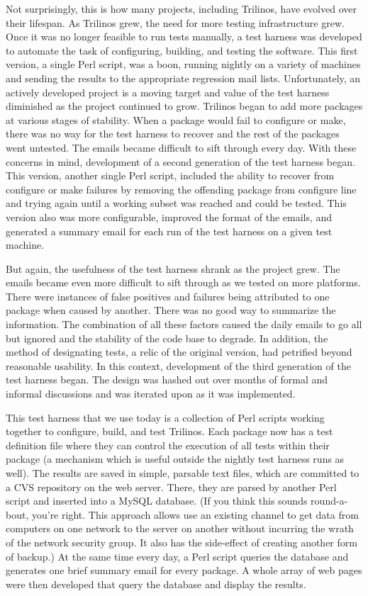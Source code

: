 \documentclass[12pt,relax]{article}
\begin{document}
Not surprisingly, this is how many projects, including Trilinos, have evolved
over their lifespan.  As Trilinos grew, the need for more testing
infrastructure grew.  Once it was no longer feasible to run tests manually,
a test harness was developed to automate the task of configuring, building, 
and testing the software.  This first version, a single Perl script, was a
boon, running nightly on a variety of machines and sending the results to the
appropriate regression mail lists.  Unfortunately, an actively developed
project is a moving target and value of the test harness diminished as the
project continued to grow.  Trilinos began to add more packages at various
stages of stability.  When a package would fail to configure or make, there
was no way for the test harness to recover and the rest of the packages went
untested.  The emails became difficult to sift through every day.  With these
concerns in mind, development of a second generation of the test harness began.
This version, another single Perl script, included the ability to recover from
configure or make failures by removing the offending package from configure
line and trying again until a working subset was reached and could be tested.  
This version also was more configurable, improved the format of the emails, and
generated a summary email for each run of the test harness on a given test
machine.

But again, the usefulness of the test harness shrank as the project grew.  The
emails became even more difficult to sift through as we tested on more
platforms.  There were instances of false positives and failures being
attributed to one package when caused by another.  There was no good way to
summarize the information.  The combination of all these factors caused the
daily emails to go all but ignored and the stability of the code base to 
degrade.  In addition, the method of designating tests, a relic of the original 
version, had petrified beyond reasonable usability.  In this context,
development of the third generation of the test harness began.  The design
was hashed out over months of formal and informal discussions and was iterated
upon as it was implemented.

This test harness that we use today is a collection of Perl scripts working
together to configure, build, and test Trilinos.  Each package now has a test
definition file where they can control the execution of all tests within their
package (a mechanism which is useful outside the nightly test harness runs
as well).  The results are saved in simple, parsable text files, which are
committed to a CVS repository on the web server.  There, they are parsed by
another Perl script and inserted into a MySQL database.  (If you think this
sounds round-a-bout, you're right.  This approach allows use an existing
channel to get data from computers on one network to the server on another
without incurring the wrath of the network security group.  It also has the
side-effect of creating another form of backup.)  At the same time every day,
a Perl script queries the database and generates one brief summary email for
every package.  A whole array of web pages were then developed that query the
database and display the results.
\end{document}
